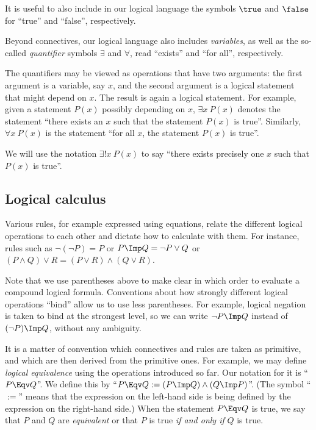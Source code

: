 It is useful to also include in our logical language the symbols $\true$ and $\false$ for ``true'' and ``false'', respectively.

Beyond connectives, our logical language also includes \emph{variables}, as well as the so-called \emph{quantifier} symbols $\exists$ and $\forall$, read ``exists'' and ``for all'', respectively.

The quantifiers may be viewed as operations that have two arguments: the first argument is a variable, say $x$, and the second argument is a logical statement that might depend on $x$.
The result is again a logical statement.
For example, given a statement $P(x)$ possibly depending on $x$, $\exists x \ P(x)$ denotes the statement ``there exists an $x$ such that the statement $P(x)$ is true''.
Similarly, $\forall x \ P(x)$ is the statement ``for all $x$, the statement $P(x)$ is true''.

We will use the notation $\exists!
    x \ P(x)$ to say ``there exists precisely one $x$ such that $P(x)$ is true''.

\subsection{Logical calculus}

Various rules, for example expressed using equations, relate the different logical operations to each other and dictate how to calculate with them.
For instance, rules such as $\lnot (\lnot P) = P$ or $P \Imp Q = \lnot P \vee Q$ or $(P \wedge Q) \vee R = (P \vee R) \wedge (Q \vee R)$.

Note that we use parentheses above to make clear in which order to evaluate a compound logical formula.
Conventions about how strongly different logical operations ``bind'' allow us to use less parentheses.
For example, logical negation is taken to bind at the strongest level, so we can write $\lnot P \Imp Q$ instead of $(\lnot P) \Imp Q$, without any ambiguity.

It is a matter of convention which connectives and rules are taken as primitive, and which are then derived from the primitive ones.
For example, we may define \emph{logical equivalence} using the operations introduced so far.
Our notation for it is ``$P \Eqv Q$''.
We define this by ``$P \Eqv Q := (P \Imp Q) \wedge (Q \Imp P)$''.
(The symbol ``$:=$'' means that the expression on the left-hand side is being defined by the expression on the right-hand side.) When the statement $P \Eqv Q$ is true, we say that $P$ and $Q$ are \emph{equivalent} or that $P$ is true \emph{if and only if} $Q$ is true.

